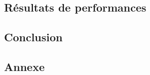 \documentclass[11pt,a4paper,oneside]{memoir}
\theoremstyle{definition}
\theoremstyle{remark}
\theoremstyle{plain}
\begin{document}

\section{Résultats de performances}
































\begin{vplace}[0.5]

\chapter*{Conclusion}



\end{vplace}







\begin{vplace}
\chapter*{Annexe}


\end{vplace}




\nocite{*}


\end{document}
